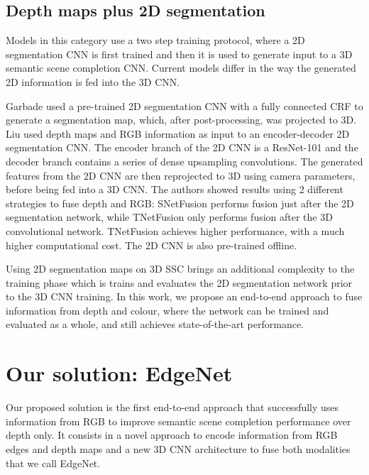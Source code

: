 \subsection{Depth maps plus 2D segmentation}

Models in this category use a two step training protocol, where a 2D segmentation CNN is first trained and then it is used to generate input to a 3D semantic scene completion CNN. Current models differ in the way the generated 2D information is fed into the 3D CNN.  

Garbade \etal \cite{garbade_two_2018} used a pre-trained 2D segmentation CNN with a fully connected CRF \cite{CRF} to generate a segmentation map, which, after post-processing, was projected to 3D. 
Liu \etal \cite{See_and_think_2018} used depth maps and RGB information as input to an encoder-decoder 2D segmentation CNN. The encoder branch of the 2D CNN is a ResNet-101 \cite{ResNet}  and the decoder branch contains a series of dense upsampling
convolutions. The generated features from the 2D CNN are then reprojected to 3D using camera parameters, before being fed into a 3D CNN. The authors showed results using 2 different strategies to fuse depth and RGB: SNetFusion performs fusion just after the 2D segmentation network, while TNetFusion only performs fusion after the 3D convolutional network. TNetFusion achieves higher performance, with a much higher computational cost.  The 2D CNN is also pre-trained offline.  

Using 2D segmentation maps on 3D SSC brings an additional complexity to the training phase which is trains and evaluates the 2D segmentation network prior to the 3D CNN training. 
In this work, we propose an end-to-end approach to fuse information from depth and colour, where the network can be trained and evaluated as a whole, and still achieves state-of-the-art performance. 


\section{Our solution: EdgeNet}

Our proposed solution is the first end-to-end approach that successfully uses information from RGB to improve semantic scene completion performance over depth only. It consists in a novel approach to encode information from RGB edges and depth maps and a new 3D CNN architecture to fuse both modalities that we call EdgeNet.

